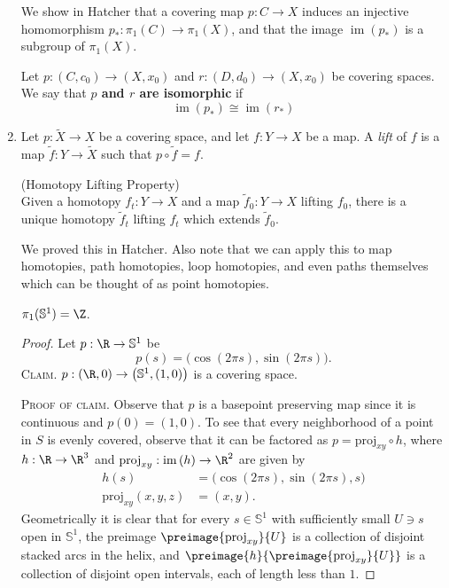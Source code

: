 \documentclass[12pt,letterpaper]{article}
\renewcommand{\image}[1]{\operatorname{im}\left(#1\right)}
\begin{document}
\begin{enumerate}
\begin{remark*}
 We show in Hatcher that a covering map $p:C\to X$ induces an injective homomorphism $p_*:\pi_1(C)\to\pi_1(X)$, and that the image $\image{p_*}$ is a subgroup of $\pi_1(X)$. 
\end{remark*}

\begin{definition*}
Let $p:(C,c_0)\to(X,x_0)$ and $r:(D,d_0)\to(X,x_0)$ be covering spaces. We say that \textbf{$p$ and $r$ are isomorphic} if 
$$\image{p_*}\cong\image{r_*}$$
\end{definition*}

\item \mbox{}\vspace*{-24pt}
\begin{definition*}
Let $p:\tilde{X}\to X$ be a covering space, and let $f:Y\to X$ be a map. A \emph{lift} of $f$ is a map $\tilde{f}:Y \to \tilde{X}$ such that $p\circ \tilde{f}=f$. 
\end{definition*}

\begin{theorem*}(Homotopy Lifting Property)\\
Given a homotopy $f_t:Y\to X$ and a map $\tilde{f}_0:Y\to X$ lifting $f_0$, there is a unique homotopy $\tilde{f}_t$ lifting $f_t$ which extends $\tilde{f}_0$. 
\end{theorem*}
\begin{remark*}
We proved this in Hatcher. Also note that we can apply this to map homotopies, path homotopies, loop homotopies, and even paths themselves which can be thought of as point homotopies. 
\end{remark*}

\pagebreak
\begin{theorem*}
$\pi_1(\mathbb{S}^1)=\Z$. 
\end{theorem*}
\begin{proof}
Let $p:\R\to\mathbb{S}^1$ be 
$$p(s)=\big(\cos(2\pi s), \sin(2\pi s)\big).$$
\textsc{Claim.} $p:(\R, 0)\to \big(\mathbb{S}^1, (1,0)\big)$ is a covering space. 

\textsc{Proof of claim.} Observe that $p$ is a basepoint preserving map since it is continuous and $p(0)=(1,0)$. To see that every neighborhood of a point in $S$ is evenly covered, observe that it can be factored as $p=\text{proj}_{xy}\circ h$, where $h:\R\to\R^3$ and $\text{proj}_{xy}:\image{h}\to\R^2$ are given by 
\begin{align*}
h(s)&=\big(\cos(2\pi s), \sin(2\pi s), s\big) \\
\text{proj}_{xy} (x,y,z) &= (x,y).
\end{align*}
Geometrically it is clear that for every $s\in\mathbb{S}^1$ with sufficiently small $U\ni s$ open in $\mathbb{S}^1$, the preimage $\preimage{\text{proj}_{xy}}{U}$ is a collection of disjoint stacked arcs in the helix, and $\preimage{h}{\preimage{\text{proj}_{xy}}{U}}$ is a collection of disjoint open intervals, each of length less than $1$. 


\end{proof}
\end{enumerate}
\end{document}

